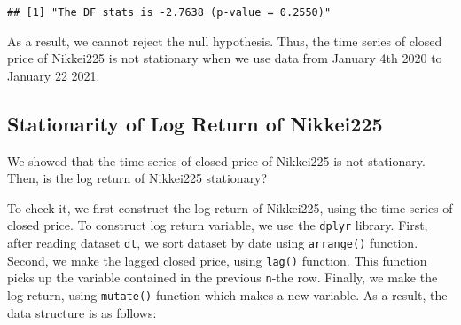\documentclass[
  12pt,
]{article}
\newenvironment{Shaded}{\begin{snugshade}}{\end{snugshade}}
\newcommand{\DataTypeTok}[1]{\textcolor[rgb]{0.13,0.29,0.53}{#1}}
\newcommand{\DecValTok}[1]{\textcolor[rgb]{0.00,0.00,0.81}{#1}}
\newcommand{\KeywordTok}[1]{\textcolor[rgb]{0.13,0.29,0.53}{\textbf{#1}}}
\newcommand{\NormalTok}[1]{#1}
\newcommand{\OperatorTok}[1]{\textcolor[rgb]{0.81,0.36,0.00}{\textbf{#1}}}
\newcommand{\StringTok}[1]{\textcolor[rgb]{0.31,0.60,0.02}{#1}}
\begin{document}
\begin{Shaded}
\end{Shaded}

\begin{verbatim}
## [1] "The DF stats is -2.7638 (p-value = 0.2550)"
\end{verbatim}

As a result, we cannot reject the null hypothesis. Thus, the time series
of closed price of Nikkei225 is not stationary when we use data from
January 4th 2020 to January 22 2021.

\hypertarget{stationarity-of-log-return-of-nikkei225}{%
\subsection{Stationarity of Log Return of
Nikkei225}\label{stationarity-of-log-return-of-nikkei225}}

We showed that the time series of closed price of Nikkei225 is not
stationary. Then, is the log return of Nikkei225 stationary?

To check it, we first construct the log return of Nikkei225, using the
time series of closed price. To construct log return variable, we use
the \texttt{dplyr} library. First, after reading dataset \texttt{dt}, we
sort dataset by date using \texttt{arrange()} function. Second, we make
the lagged closed price, using \texttt{lag()} function. This function
picks up the variable contained in the previous \texttt{n}-the row.
Finally, we make the log return, using \texttt{mutate()} function which
makes a new variable. As a result, the data structure is as follows:
\end{document}
